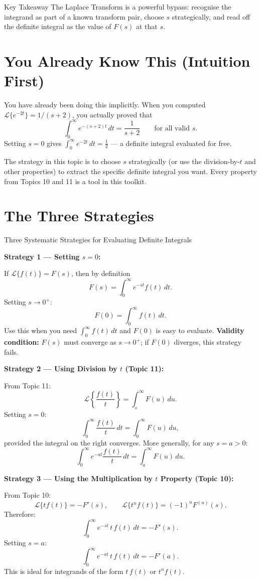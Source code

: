 \documentclass[12pt,a4paper]{article}
\begin{document}
\begin{learnbox}{Key Takeaway}
The Laplace Transform is a powerful bypass: recognise the integrand as part of a
known transform pair, choose $s$ strategically, and read off the definite
integral as the value of $F(s)$ at that $s$.
\end{learnbox}

\section{You Already Know This (Intuition First)}

You have already been doing this implicitly. When you computed
$\mathcal{L}\{e^{-2t}\} = 1/(s+2)$, you actually proved that
\[
  \int_0^\infty e^{-(s+2)t}\, dt = \frac{1}{s+2} \qquad \text{for all valid } s.
\]
Setting $s = 0$ gives $\int_0^\infty e^{-2t}\, dt = \tfrac{1}{2}$ --- a
definite integral evaluated for free.

The strategy in this topic is to choose $s$ strategically (or use the
division-by-$t$ and other properties) to extract the specific definite integral
you want. Every property from Topics 10 and 11 is a tool in this toolkit.

\section{The Three Strategies}

\begin{infobox}{Three Systematic Strategies for Evaluating Definite Integrals}

\textbf{Strategy 1 --- Setting $s = 0$:}

If $\mathcal{L}\{f(t)\} = F(s)$, then by definition
\[
  F(s) = \int_0^\infty e^{-st} f(t)\, dt.
\]
Setting $s \to 0^+$:
\[
  F(0) = \int_0^\infty f(t)\, dt.
\]
Use this when you need $\int_0^\infty f(t)\, dt$ and $F(0)$ is easy to evaluate.
\textbf{Validity condition:} $F(s)$ must converge as $s \to 0^+$; if $F(0)$
diverges, this strategy fails.

\medskip
\textbf{Strategy 2 --- Using Division by $t$ (Topic 11):}

From Topic 11:
\[
  \mathcal{L}\!\left\{\frac{f(t)}{t}\right\} = \int_s^\infty F(u)\, du.
\]
Setting $s = 0$:
\[
  \int_0^\infty \frac{f(t)}{t}\, dt = \int_0^\infty F(u)\, du,
\]
provided the integral on the right converges.
More generally, for any $s = a > 0$:
\[
  \int_0^\infty e^{-at} \frac{f(t)}{t}\, dt = \int_a^\infty F(u)\, du.
\]

\medskip
\textbf{Strategy 3 --- Using the Multiplication by $t$ Property (Topic 10):}

From Topic 10:
\[
  \mathcal{L}\{t f(t)\} = -F'(s), \qquad
  \mathcal{L}\{t^n f(t)\} = (-1)^n F^{(n)}(s).
\]
Therefore:
\[
  \int_0^\infty e^{-st}\, t\, f(t)\, dt = -F'(s).
\]
Setting $s = a$:
\[
  \int_0^\infty e^{-at}\, t\, f(t)\, dt = -F'(a).
\]
This is ideal for integrands of the form $t\,f(t)$ or $t^n f(t)$.

\end{infobox}
\end{document}
